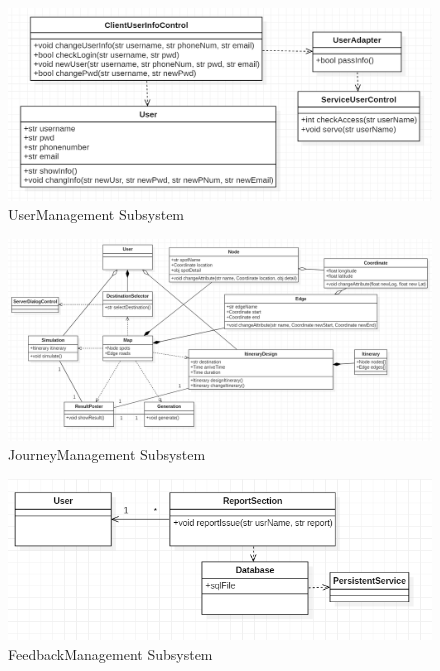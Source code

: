 \documentclass[10pt]{article}
\begin{document}
\begin{figure}[H]
    \centering
    
    \includegraphics[width=14cm]{usermanagement.png}
    \caption{UserManagement Subsystem}
    \label{UserManagement Subsystem}
\end{figure}

\begin{figure}[H]
    \centering
    
    \includegraphics[width=14cm]{journeymanagement.png}
    \caption{JourneyManagement Subsystem}
    \label{JourneyManagement Subsystem}
\end{figure}

\begin{figure}[H]
    \centering
    
    \includegraphics[width=14cm]{reportmanagement.png}
    \caption{FeedbackManagement Subsystem}
    \label{FeedbackManagement Subsystem}
\end{figure}
\end{document}
